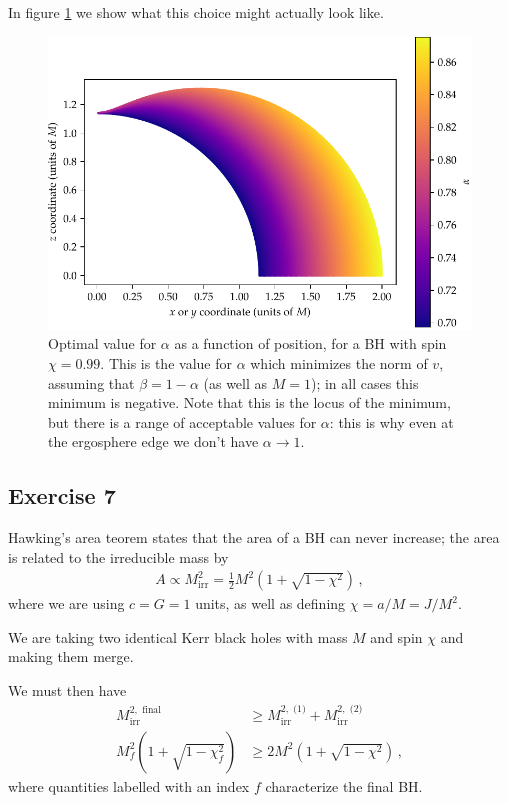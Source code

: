 \documentclass[main.tex]{subfiles}
\begin{document}
In figure \ref{fig:kerr_killing} we show what this choice might actually look like.

\begin{figure}[ht]
\centering
\includegraphics[width=\textwidth]{figures/kerr_killing}
\caption{Optimal value for \(\alpha \) as a function of position, for a BH with spin \(\chi = 0.99\). This is the value for \(\alpha \) which minimizes the norm of \(v\), assuming that \(\beta = 1 - \alpha \) (as well as \(M = 1\)); in all cases this minimum is negative.
Note that this is the locus of the minimum, but there is a range of acceptable values for \(\alpha \): this is why even at the ergosphere edge we don't have \(\alpha \to 1\). }
\label{fig:kerr_killing}
\end{figure}

\subsection{Exercise 7}

Hawking's area teorem states that the area of a BH can never increase; the area is related to the irreducible mass by 
%
\begin{align}
A \propto M _{\text{irr}}^2 = \frac{1}{2} M^2\left(1 + \sqrt{1 - \chi^2}\right)
\,,
\end{align}
%
where we are using \(c = G = 1\) units, as well as defining \(\chi = a / M = J / M^2\).  

We are taking two identical Kerr black holes with mass \(M\) and spin \(\chi\) and making them merge. 

We must then have %
\begin{align}
M_{\text{irr}}^{2, \text{ final}} &\geq 
M^{2, \text{ (1)}} _{\text{irr}}  +
M^{2, \text{ (2)}} _{\text{irr}}  
\\
M_f^2 \left( 1+ \sqrt{1 - \chi _f^2}\right) &\geq 2 M^2\left(1 + \sqrt{1 - \chi^2}\right)
\,,
\end{align}
%
where quantities labelled with an index \(f\) characterize the final BH. 
\end{document}
